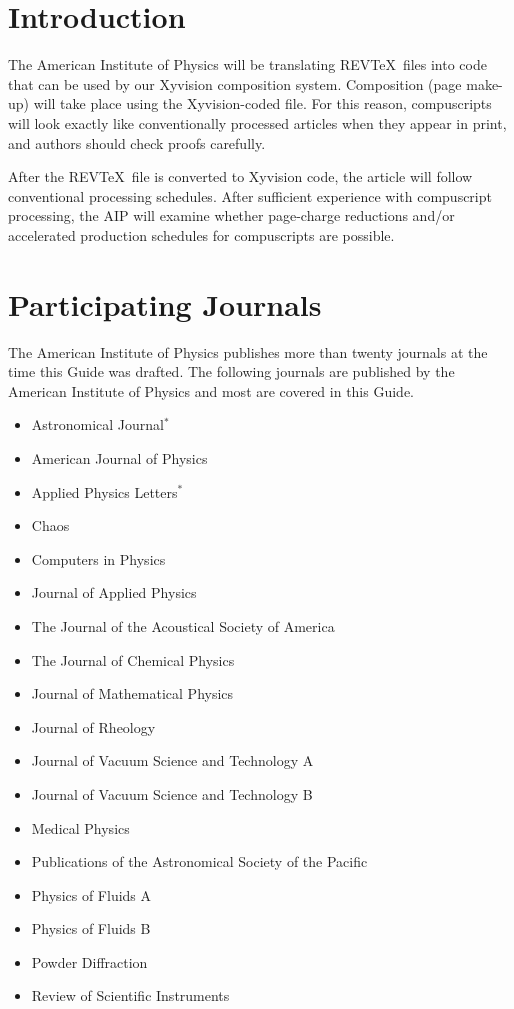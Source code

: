 \section{Introduction}

The American Institute of Physics will be translating REV\TeX\ files into
code that can be used by our Xyvision composition system.  Composition
(page make-up) will take place using the Xyvision-coded file. For this
reason, compuscripts will look exactly like conventionally processed
articles when they appear in print, and authors should check proofs
carefully.

After the REV\TeX\ file is converted to Xyvision code, the article will
follow conventional processing schedules.  After sufficient experience with
compuscript processing, the AIP will examine whether page-charge reductions
and/or accelerated production schedules for compuscripts are possible.


\section{Participating Journals }

The American Institute of Physics publishes more than twenty journals at
the time this Guide was drafted.  The following journals are published by
the American Institute of Physics and most are covered in this Guide.


\begin{itemize}
      \item Astronomical Journal$^*$
      \item American Journal of Physics
      \item Applied Physics Letters$^*$
      \item Chaos
      \item Computers in Physics
      \item Journal of Applied Physics
      \item The Journal of the Acoustical Society of America
      \item The Journal of Chemical Physics
      \item Journal of Mathematical Physics
      \item Journal of Rheology
      \item Journal of Vacuum Science and Technology A
      \item Journal of Vacuum Science and Technology B
      \item Medical Physics
      \item Publications of the Astronomical Society of the Pacific
      \item Physics of Fluids A
      \item Physics of Fluids B
      \item Powder Diffraction
      \item Review of Scientific Instruments
\end{itemize}

